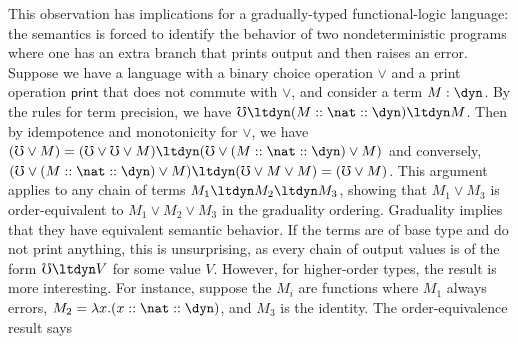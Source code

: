 \documentclass[acmsmall,screen,review,anonymous]{acmart}
\theoremstyle{remark}
\newif\ifdraft
\renewcommand{\max}[1]{\ifdraft{\color{blue}[{\bf Max says}: #1]}\fi}
\begin{document}
%


This observation has implications for a gradually-typed functional-logic
language: the semantics is forced to identify the behavior of two
nondeterministic programs where one has an extra branch that prints output and
then raises an error.
%
Suppose we have a language with a binary choice operation $\vee$ and a print
operation $\mathsf{print}$ that does not commute with $\vee$, and consider a
term $M : \dyn$. By the rules for term precision, we have $\mho \ltdyn (M ::
\nat :: \dyn) \ltdyn M$. Then by idempotence and monotonicity for $\vee$, we
have
%
$(\mho \vee M) = (\mho \vee \mho \vee M) \ltdyn (\mho \vee (M :: \nat :: \dyn) \vee M)$ 
%
and conversely,
%
$(\mho \vee (M :: \nat :: \dyn) \vee M) \ltdyn (\mho \vee M \vee M) = (\mho \vee M)$.
%
%
This argument applies to any chain of terms $M_1 \ltdyn M_2 \ltdyn M_3$, showing
that $M_1 \vee M_3$ is order-equivalent to $M_1 \vee M_2 \vee M_3$ in the
graduality ordering. Graduality implies that they have equivalent semantic
behavior. If the terms are of base type and do not print anything, this is
unsurprising, as every chain of output values is of the form $\mho \ltdyn V$ for
some value $V$.
%
However, for higher-order types, the result is more interesting. For instance,
suppose the $M_i$ are functions where $M_1$ always errors, $M_2 = \lambda x.(x
:: \nat :: \dyn)$, and $M_3$ is the identity. The order-equivalence result says
\end{document}

